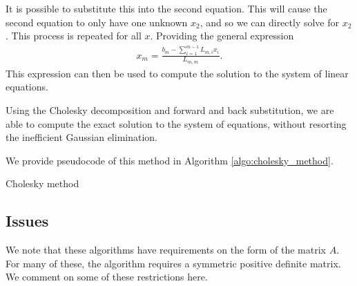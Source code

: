 \documentclass[../fem.tex]{subfile}
\begin{document}
It is possible to substitute this into the second equation. This will cause the
second equation to only have one unknown $x_2$, and so we can directly solve
for $x_2$. This process is repeated for all $x$. Providing the general
expression
\begin{align*}
  x_m=\frac{b_m-\sum_{i=1}^{m-1}L_{m,i}x_i}{L_{m,m}}.
\end{align*}
This expression can then be used to compute the solution to the system of
linear equations.

Using the Cholesky decomposition and forward and back substitution, we are able
to compute the exact solution to the system of equations, without resorting the
inefficient Gaussian elimination.

We provide pseudocode of this method in Algorithm \ref{algo:cholesky_method}.

\begin{algorithm}[H]
  \caption{Cholesky method}\label{algo:cholesky_method}
  \begin{algorithmic}
    \State{}
      \EndFor
        \EndFor
      \EndFor
    \EndFor
    \State{}
      \EndFor
    \EndFor
    \State{}
      \EndFor
    \EndFor
  \end{algorithmic}
\end{algorithm}

\subsection{Issues}%
\label{sub:issues}

We note that these algorithms have requirements on the form of the matrix $A$.
For many of these, the algorithm requires a symmetric positive definite matrix.
We comment on some of these restrictions here.
\end{document}
